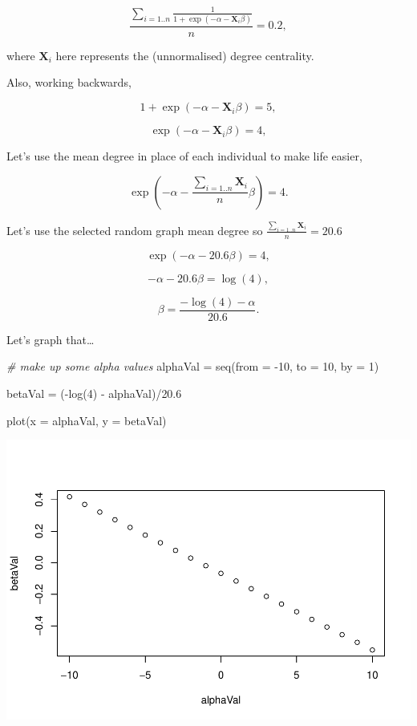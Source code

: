\documentclass[
]{article}
\newenvironment{Shaded}{\begin{snugshade}}{\end{snugshade}}
\newcommand{\AttributeTok}[1]{\textcolor[rgb]{0.77,0.63,0.00}{#1}}
\newcommand{\CommentTok}[1]{\textcolor[rgb]{0.56,0.35,0.01}{\textit{#1}}}
\newcommand{\DecValTok}[1]{\textcolor[rgb]{0.00,0.00,0.81}{#1}}
\newcommand{\FloatTok}[1]{\textcolor[rgb]{0.00,0.00,0.81}{#1}}
\newcommand{\FunctionTok}[1]{\textcolor[rgb]{0.00,0.00,0.00}{#1}}
\newcommand{\NormalTok}[1]{#1}
\newcommand{\OtherTok}[1]{\textcolor[rgb]{0.56,0.35,0.01}{#1}}
\newcommand{\SpecialCharTok}[1]{\textcolor[rgb]{0.00,0.00,0.00}{#1}}
\begin{document}
\[\frac{\sum_{i = 1..n} \frac{1}{1 + \exp(-\alpha -\mathbf{X}_i \beta)}}{n} = 0.2,\]

where \(\mathbf{X}_i\) here represents the (unnormalised) degree
centrality.

Also, working backwards,

\[1 + \exp(-\alpha - \mathbf{X}_i\beta) = 5,\]

\[\exp(-\alpha - \mathbf{X}_i\beta) = 4,\]

Let's use the mean degree in place of each individual to make life
easier,

\[\exp(-\alpha - \frac{\sum_{i = 1..n} \mathbf{X}_i}{n} \beta) = 4.\]

Let's use the selected random graph mean degree so
\(\frac{\sum_{i = 1..n} \mathbf{X}_i}{n} = 20.6\)

\[\exp(-\alpha - 20.6\beta) = 4,\]

\[-\alpha - 20.6\beta = \log(4),\]

\[\beta = \frac{-\log(4) - \alpha}{20.6}.\]

Let's graph that\ldots{}

\begin{Shaded}
\begin{Highlighting}[]
\CommentTok{\# make up some alpha values}
\NormalTok{alphaVal }\OtherTok{=} \FunctionTok{seq}\NormalTok{(}\AttributeTok{from =} \SpecialCharTok{{-}}\DecValTok{10}\NormalTok{, }\AttributeTok{to =} \DecValTok{10}\NormalTok{, }\AttributeTok{by =} \DecValTok{1}\NormalTok{)}

\NormalTok{betaVal }\OtherTok{=}\NormalTok{ (}\SpecialCharTok{{-}}\FunctionTok{log}\NormalTok{(}\DecValTok{4}\NormalTok{) }\SpecialCharTok{{-}}\NormalTok{ alphaVal)}\SpecialCharTok{/}\FloatTok{20.6}

\FunctionTok{plot}\NormalTok{(}\AttributeTok{x =}\NormalTok{ alphaVal, }\AttributeTok{y =}\NormalTok{ betaVal)}
\end{Highlighting}
\end{Shaded}

\includegraphics{20220404_miss_data_model_files/figure-latex/graphing fn-1.pdf}
\end{document}
